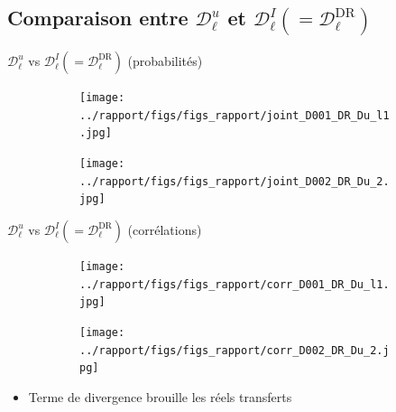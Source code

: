 \documentclass[aspectratio=169,usenames,dvipsnames]{beamer}
\begin{document}
\subsection{Comparaison entre $\mathscr{D}^u_\ell$ et $\mathscr{D}^I_\ell(=\mathscr{D}^{\mathrm{DR}}_\ell)$}
\begin{frame}{$\mathscr{D}^u_\ell$ vs $\mathscr{D}^I_\ell(=\mathscr{D}^{\mathrm{DR}}_\ell)$ (probabilités)}
\begin{figure}[H]
    \centering
    \begin{subfigure}[b]{0.48\linewidth}
    \centering
    \texttt{[image: ../rapport/figs/figs\_rapport/joint\_D001\_DR\_Du\_l1.jpg]}
    \end{subfigure}
    \begin{subfigure}[b]{0.48\linewidth}
      \centering
      \texttt{[image: ../rapport/figs/figs\_rapport/joint\_D002\_DR\_Du\_2.jpg]}
      \end{subfigure}
    \label{fig:dudr_joint}
  \end{figure}
\end{frame}

\begin{frame}{$\mathscr{D}^u_\ell$ vs $\mathscr{D}^I_\ell(=\mathscr{D}^{\mathrm{DR}}_\ell)$ (corrélations)}
    \begin{figure}[H]
        \centering
        \begin{subfigure}[b]{0.48\linewidth}
        \centering
        \texttt{[image: ../rapport/figs/figs\_rapport/corr\_D001\_DR\_Du\_l1.jpg]}
        \end{subfigure}
        \begin{subfigure}[b]{0.48\linewidth}
          \centering
          \texttt{[image: ../rapport/figs/figs\_rapport/corr\_D002\_DR\_Du\_2.jpg]}
          \end{subfigure}
        \label{fig:dudr_joint}
      \end{figure}
      \begin{itemize}[label=]\pause
        \item Terme de divergence brouille les réels transferts
      \end{itemize}
    \end{frame}
\end{document}
